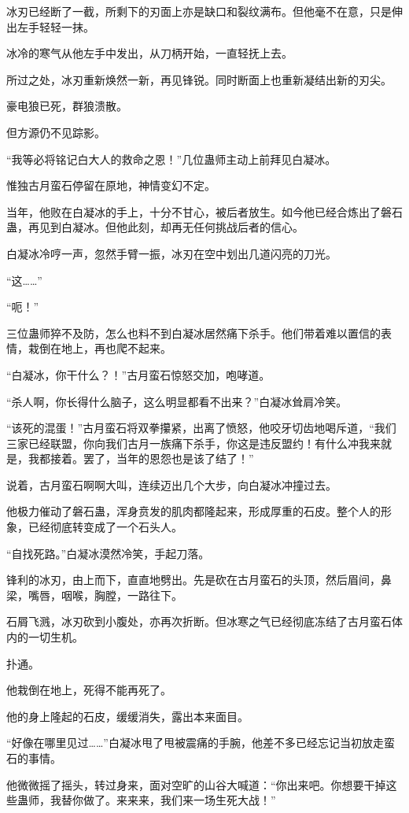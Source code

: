 \begin{this_body}
冰刃已经断了一截，所剩下的刃面上亦是缺口和裂纹满布。但他毫不在意，只是伸出左手轻轻一抹。

冰冷的寒气从他左手中发出，从刀柄开始，一直轻抚上去。

所过之处，冰刃重新焕然一新，再见锋锐。同时断面上也重新凝结出新的刃尖。

豪电狼已死，群狼溃散。

但方源仍不见踪影。

“我等必将铭记白大人的救命之恩！”几位蛊师主动上前拜见白凝冰。

惟独古月蛮石停留在原地，神情变幻不定。

当年，他败在白凝冰的手上，十分不甘心，被后者放生。如今他已经合炼出了磐石蛊，再见到白凝冰。但他此刻，却再无任何挑战后者的信心。

白凝冰冷哼一声，忽然手臂一振，冰刃在空中划出几道闪亮的刀光。

“这……”

“呃！”

三位蛊师猝不及防，怎么也料不到白凝冰居然痛下杀手。他们带着难以置信的表情，栽倒在地上，再也爬不起来。

“白凝冰，你干什么？！”古月蛮石惊怒交加，咆哮道。

“杀人啊，你长得什么脑子，这么明显都看不出来？”白凝冰耸肩冷笑。

“该死的混蛋！”古月蛮石将双拳攥紧，出离了愤怒，他咬牙切齿地喝斥道，“我们三家已经联盟，你向我们古月一族痛下杀手，你这是违反盟约！有什么冲我来就是，我都接着。罢了，当年的恩怨也是该了结了！”

说着，古月蛮石啊啊大叫，连续迈出几个大步，向白凝冰冲撞过去。

他极力催动了磐石蛊，浑身贲发的肌肉都隆起来，形成厚重的石皮。整个人的形象，已经彻底转变成了一个石头人。

“自找死路。”白凝冰漠然冷笑，手起刀落。

锋利的冰刃，由上而下，直直地劈出。先是砍在古月蛮石的头顶，然后眉间，鼻梁，嘴唇，咽喉，胸膛，一路往下。

石屑飞溅，冰刃砍到小腹处，亦再次折断。但冰寒之气已经彻底冻结了古月蛮石体内的一切生机。

扑通。

他栽倒在地上，死得不能再死了。

他的身上隆起的石皮，缓缓消失，露出本来面目。

“好像在哪里见过……”白凝冰甩了甩被震痛的手腕，他差不多已经忘记当初放走蛮石的事情。

他微微摇了摇头，转过身来，面对空旷的山谷大喊道：“你出来吧。你想要干掉这些蛊师，我替你做了。来来来，我们来一场生死大战！”


\end{this_body}

